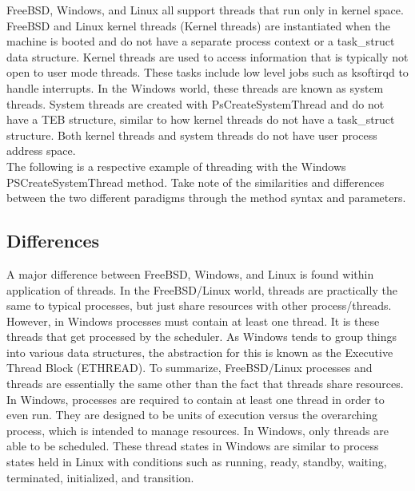 \documentclass[letterpaper,10pt,titlepage]{article}
\begin{document}
FreeBSD, Windows, and Linux all support threads that run only in kernel space.  FreeBSD and Linux kernel threads (Kernel threads) are instantiated when the machine is booted and do not have a separate process context or a task\_struct data structure.  Kernel threads are used to access information that is typically not open to user mode threads.  These tasks include low level jobs such as ksoftirqd to handle interrupts.  In the Windows world, these threads are known as system threads.  System threads are created with PsCreateSystemThread and do not have a TEB structure, similar to how kernel threads do not have a task\_struct structure.\cite{lkd4}  Both kernel threads and system threads do not have user process address space.\\

The following is a respective example of threading with the Windows PSCreateSystemThread method. \cite{PsCreateSystemThread} Take note of the similarities and differences between the two different paradigms through the method syntax and parameters.



\subsection{Differences}

A major difference between FreeBSD, Windows, and Linux is found within application of threads.  In the FreeBSD/Linux world, threads are practically the same to typical processes, but just share resources with other process/threads.  However, in Windows processes must contain at least one thread.  It is these threads that get processed by the scheduler.  As Windows tends to group things into various data structures, the abstraction for this is known as the Executive Thread Block (ETHREAD).  To summarize, FreeBSD/Linux processes and threads are essentially the same other than the fact that threads share resources.  In Windows, processes are required to contain at least one thread in order to even run.  They are designed to be units of execution versus the overarching process, which is intended to manage resources.\cite{mwi5}  In Windows, only threads are able to be scheduled.  These thread states in Windows are similar to process states held in Linux with conditions such as running, ready, standby, waiting, terminated, initialized, and transition.\cite{lkd4}\\
\end{document}
